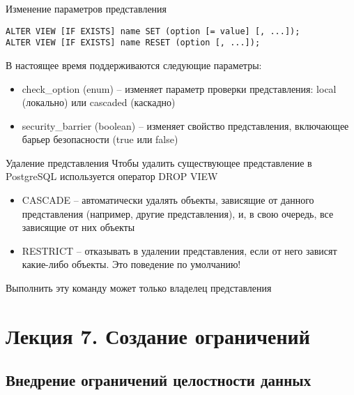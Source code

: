 \documentclass[12pt]{article}
\begin{document}
\begin{nota}{Изменение параметров представления}
\begin{lstlisting}
ALTER VIEW [IF EXISTS] name SET (option [= value] [, ...]);
ALTER VIEW [IF EXISTS] name RESET (option [, ...]);
\end{lstlisting}

    В настоящее время поддерживаются следующие параметры:

    \begin{itemize}
        \item check\_option (enum) -- изменяет параметр проверки представления: local (локально) или cascaded (каскадно)
        \item security\_barrier (boolean) -- изменяет свойство представления, включающее барьер безопасности (true или false)
    \end{itemize}
\end{nota}

\begin{nota}{Удаление представления}
    Чтобы удалить существующее представление в PostgreSQL используется оператор DROP VIEW

    \begin{itemize}
        \item CASCADE -- автоматически удалять объекты, зависящие от данного представления (например, другие представления), и, в свою очередь, все зависящие от них объекты 
        \item RESTRICT -- отказывать в удалении представления, если от него зависят какие-либо объекты. Это поведение по умолчанию!
    \end{itemize}

    Выполнить эту команду может только владелец представления 
\end{nota}

\newpage 

\section{Лекция 7. Создание ограничений}

\subsection{Внедрение ограничений целостности данных}
\end{document}
